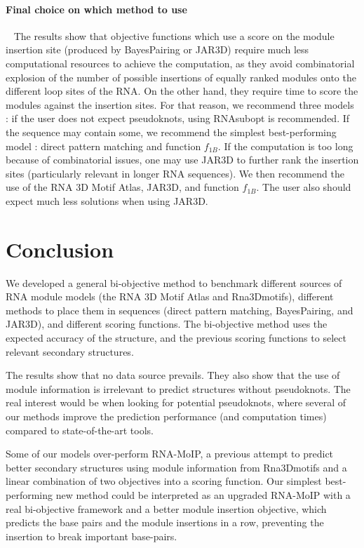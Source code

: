 \documentclass{bioinfo}
\begin{document}
\paragraph{Final choice on which method to use}\label{sec:recommend} ~
The results show that objective functions which use a score on the module insertion site (produced by BayesPairing or JAR3D) require much less computational resources to achieve the computation, as they avoid combinatorial explosion of the number of possible insertions of equally ranked modules onto the different loop sites of the RNA.
On the other hand, they require time to score the modules against the insertion sites.
For that reason, we recommend three models : if the user does not expect pseudoknots, using RNAsubopt is recommended. If the sequence may contain some, we recommend the simplest best-performing model : direct pattern matching and function $f_{1B}$. If the computation is too long because of combinatorial issues, one may use JAR3D to further rank the insertion sites (particularly relevant in longer RNA sequences). We then recommend the use of the RNA 3D Motif Atlas, JAR3D, and function $f_{1B}$. The user also should expect much less solutions when using JAR3D.


\section{Conclusion}
We developed a general bi-objective method to benchmark different sources of RNA module models (the RNA 3D Motif Atlas and Rna3Dmotifs), different methods to place them in sequences (direct pattern matching, BayesPairing, and JAR3D), and different scoring functions. The bi-objective method uses the expected accuracy of the structure, and the previous scoring functions to select relevant secondary structures.
   
The results show that no data source prevails. They also show that the use of module information is irrelevant to predict structures without pseudoknots. 
The real interest would be when looking for potential pseudoknots, where several of our methods improve the prediction performance (and computation times) compared to state-of-the-art tools.

Some of our models over-perform RNA-MoIP, a previous attempt to predict better secondary structures using module information from Rna3Dmotifs and a linear combination of two objectives into a scoring function. Our simplest best-performing new method could be interpreted as an upgraded RNA-MoIP with a real bi-objective framework and a better module insertion objective, which predicts the base pairs and the module insertions in a row, preventing the insertion to break important base-pairs.
\end{document}
